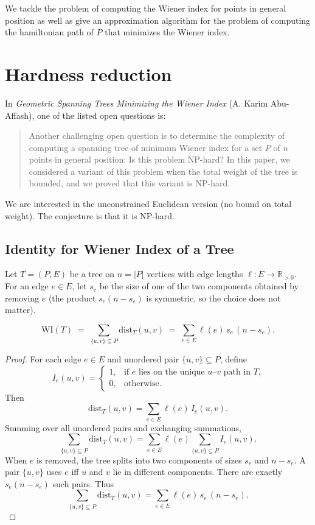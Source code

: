 \documentclass{article}
\begin{document}
We tackle the problem of computing the Wiener index for points in general position as well as give an approximation algorithm for the problem of computing the hamiltonian path of $P$ that minimizes the Wiener index.

\section{Hardness reduction}
In \emph{Geometric Spanning Trees Minimizing the Wiener Index} (A. Karim Abu-Affash), one of the listed open questions is:

\begin{quote}
	Another challenging open question is to determine the complexity of computing a spanning tree of minimum Wiener index for a set $P$ of $n$ points in general position: Is this problem NP-hard? In this paper, we considered a variant of this problem when the total weight of the tree is bounded, and we proved that this variant is NP-hard.
\end{quote}

We are interested in the unconstrained Euclidean version (no bound on total weight). The conjecture is that it is NP-hard.

\subsection{Identity for Wiener Index of a Tree}

Let $T=(P,E)$ be a tree on $n=|P|$ vertices with edge lengths $\ell:E\to \mathbb{R}_{>0}$. For an edge $e\in E$, let $s_e$ be the size of one of the two components obtained by removing $e$ (the product $s_e(n-s_e)$ is symmetric, so the choice does not matter).

\begin{theorem}
	\[
		\mathrm{WI}(T) \;=\; \sum_{\{u,v\}\subseteq P}\mathrm{dist}_T(u,v)
		\;=\; \sum_{e\in E}\ell(e)\,s_e\,(n-s_e).
	\]
\end{theorem}

\begin{proof}
	For each edge $e\in E$ and unordered pair $\{u,v\}\subseteq P$, define
	\[
		I_e(u,v) =
		\begin{cases}
			1, & \text{if $e$ lies on the unique $u$--$v$ path in $T$,} \\
			0, & \text{otherwise.}
		\end{cases}
	\]
	Then
	\[
		\mathrm{dist}_T(u,v) = \sum_{e\in E}\ell(e)\,I_e(u,v).
	\]
	Summing over all unordered pairs and exchanging summations,
	\[
		\sum_{\{u,v\}\subseteq P}\mathrm{dist}_T(u,v)
		= \sum_{e\in E}\ell(e)\sum_{\{u,v\}\subseteq P}I_e(u,v).
	\]
	When $e$ is removed, the tree splits into two components of sizes $s_e$ and $n-s_e$. A pair $\{u,v\}$ uses $e$ iff $u$ and $v$ lie in different components. There are exactly $s_e(n-s_e)$ such pairs. Thus
	\[
		\sum_{\{u,v\}\subseteq P}\mathrm{dist}_T(u,v)
		= \sum_{e\in E}\ell(e)\,s_e\,(n-s_e).
	\]
\end{proof}
\end{document}
